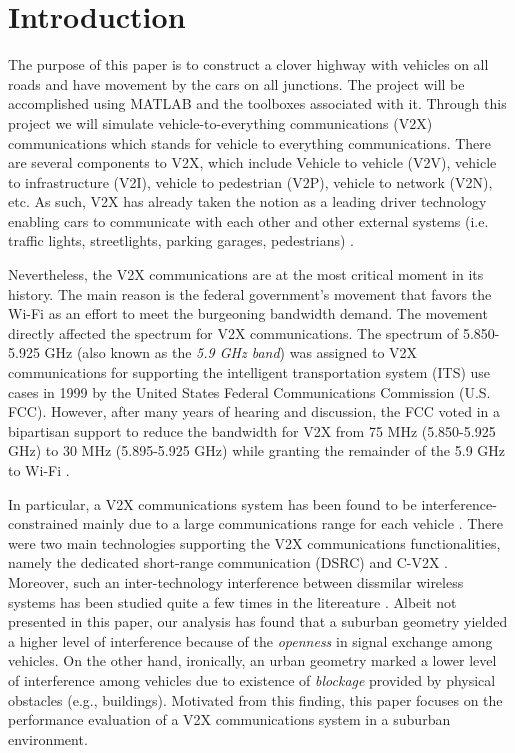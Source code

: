 \documentclass[journal]{IEEEtran}
\begin{document}
\section{Introduction}\label{sec_intro}
The purpose of this paper is to construct a clover highway with vehicles on all roads and have movement by the cars on all junctions. The project will be accomplished using MATLAB and the toolboxes associated with it. Through this project we will simulate vehicle-to-everything communications (V2X) communications which stands for vehicle to everything communications. There are several components to V2X, which include Vehicle to vehicle (V2V), vehicle to infrastructure (V2I), vehicle to pedestrian (V2P), vehicle to network (V2N), etc. As such, V2X has already taken the notion as a leading driver technology enabling cars to communicate with each other and other external systems (i.e. traffic lights, streetlights, parking garages, pedestrians) \cite{access19}.

Nevertheless, the V2X communications are at the most critical moment in its history. The main reason is the federal government's movement that favors the Wi-Fi as an effort to meet the burgeoning bandwidth demand. The movement directly affected the spectrum for V2X communications. The spectrum of 5.850-5.925 GHz (also known as the \textit{5.9 GHz band}) was assigned to V2X communications for supporting the intelligent transportation system (ITS) use cases in 1999 by the United States Federal Communications Commission (U.S. FCC). However, after many years of hearing and discussion, the FCC voted in a bipartisan support to reduce the bandwidth for V2X from 75 MHz (5.850-5.925 GHz) to 30 MHz (5.895-5.925 GHz) while granting the remainder of the 5.9 GHz to Wi-Fi \cite{nprm}.

In particular, a V2X communications system has been found to be interference-constrained mainly due to a large communications range for each vehicle \cite{etri17}. There were two main technologies supporting the V2X communications functionalities, namely the dedicated short-range communication (DSRC) \cite{globecom18}\cite{access20} and C-V2X \cite{vtc20}\cite{vtc21}. Moreover, such an inter-technology interference between dissmilar wireless systems has been studied quite a few times in the litereature \cite{pimrc08}\cite{lett17}. Albeit not presented in this paper, our analysis has found that a suburban geometry yielded a higher level of interference because of the \textit{openness} in signal exchange among vehicles. On the other hand, ironically, an urban geometry marked a lower level of interference among vehicles due to existence of \textit{blockage} provided by physical obstacles (e.g., buildings). Motivated from this finding, this paper focuses on the performance evaluation of a V2X communications system in a suburban environment.
\end{document}
